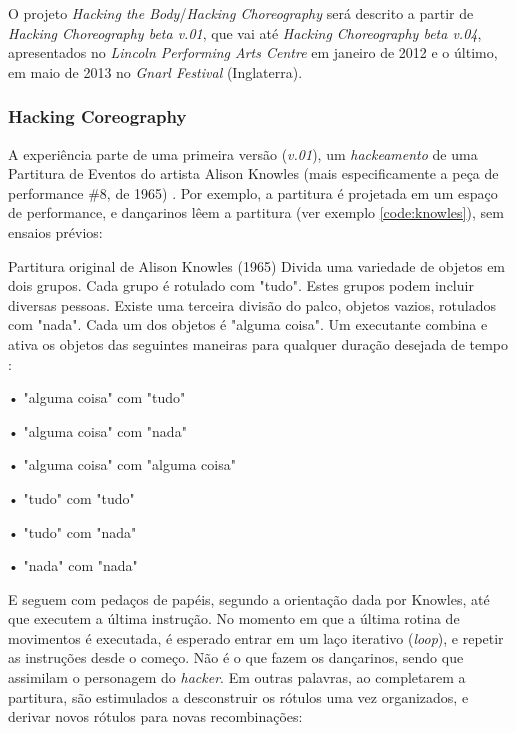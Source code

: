 O projeto \emph{Hacking the Body}/\emph{Hacking Choreography} será descrito a partir de \emph{Hacking Choreography beta v.01}, que vai até \emph{Hacking Choreography beta v.04}, apresentados no \emph{Lincoln Performing Arts Centre} em janeiro de 2012 e o último, em maio de 2013 no \emph{Gnarl Festival} (Inglaterra).

\subsubsection{Hacking Coreography}

A experiência parte de uma primeira versão (\emph{v.01}), um \emph{hackeamento} de uma Partitura de Eventos do artista Alison Knowles (mais especificamente a peça de performance \#8, de 1965) . Por exemplo, a partitura é projetada em um espaço de performance, e dançarinos lêem a partitura (ver exemplo \ref{code:knowles}), sem ensaios prévios: 

\begin{example}{Partitura original de Alison Knowles (1965)}\label{code:knowles}
\scriptsize
Divida uma variedade de objetos em dois grupos. 
Cada grupo é rotulado com "tudo". 
Estes grupos podem incluir diversas pessoas. 
Existe uma terceira divisão do palco, objetos vazios, rotulados com "nada". 
Cada um dos objetos é "alguma coisa". 
Um executante combina e ativa os objetos das seguintes maneiras para qualquer duração desejada de tempo :

• "alguma coisa" com "tudo"

• "alguma coisa" com "nada"

• "alguma coisa" com "alguma coisa"

• "tudo" com "tudo"

• "tudo" com "nada"

• "nada" com "nada"
\end{example}

E seguem com pedaços de papéis, segundo a orientação dada por Knowles, até que executem a última instrução. No momento em que a última rotina de movimentos é executada, é esperado entrar em um laço iterativo (\emph{loop}), e repetir as instruções desde o começo. Não é o que fazem os dançarinos, sendo que assimilam o personagem do \emph{hacker}. Em outras palavras, ao completarem a partitura, são estimulados a desconstruir os rótulos uma vez organizados, e derivar novos rótulos para novas recombinações:

